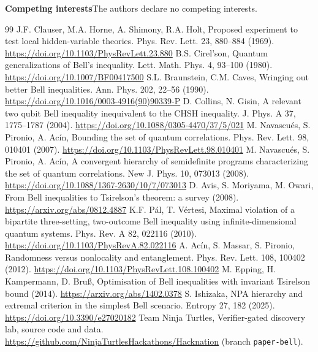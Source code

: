 \documentclass[10pt,twocolumn,a4paper]{article}
\theoremstyle{definition}
\theoremstyle{remark}
\begin{document}
\smallskip
\noindent\textbf{Competing interests}\enspace The authors declare no competing interests.

\begin{thebibliography}{99}\small
{} J.F. Clauser, M.A. Horne, A. Shimony, R.A. Holt, Proposed experiment to test local hidden-variable theories.
Phys. Rev. Lett. 23, 880--884 (1969). \url{https://doi.org/10.1103/PhysRevLett.23.880}
 B.S. Cirel'son, Quantum generalizations of Bell's inequality. Lett. Math. Phys. 4, 93--100 (1980).
\url{https://doi.org/10.1007/BF00417500}
 S.L. Braunstein, C.M. Caves, Wringing out better Bell inequalities. Ann. Phys. 202, 22--56 (1990).
\url{https://doi.org/10.1016/0003-4916(90)90339-P}
 D. Collins, N. Gisin, A relevant two qubit Bell inequality inequivalent to the CHSH inequality. J. Phys. A 37,
1775--1787 (2004). \url{https://doi.org/10.1088/0305-4470/37/5/021}
 M. Navascu\'es, S. Pironio, A. Ac\'in, Bounding the set of quantum correlations. Phys. Rev. Lett. 98, 010401
(2007). \url{https://doi.org/10.1103/PhysRevLett.98.010401}
 M. Navascu\'es, S. Pironio, A. Ac\'in, A convergent hierarchy of semidefinite programs characterizing the set of
quantum correlations. New J. Phys. 10, 073013 (2008). \url{https://doi.org/10.1088/1367-2630/10/7/073013}
 D. Avis, S. Moriyama, M. Owari, From Bell inequalities to Tsirelson's theorem: a survey (2008).
\url{https://arxiv.org/abs/0812.4887}
 K.F. P\'al, T. V\'ertesi, Maximal violation of a bipartite three-setting, two-outcome Bell inequality using
infinite-dimensional quantum systems. Phys. Rev. A 82, 022116 (2010). \url{https://doi.org/10.1103/PhysRevA.82.022116}
 A. Ac\'in, S. Massar, S. Pironio, Randomness versus nonlocality and entanglement. Phys. Rev. Lett. 108, 100402
(2012). \url{https://doi.org/10.1103/PhysRevLett.108.100402}
 M. Epping, H. Kampermann, D. Bru\ss, Optimisation of Bell inequalities with invariant Tsirelson bound (2014).
\url{https://arxiv.org/abs/1402.0378}
 S. Ishizaka, NPA hierarchy and extremal criterion in the simplest Bell scenario. Entropy 27, 182 (2025).
\url{https://doi.org/10.3390/e27020182}
 Team Ninja Turtles, Verifier-gated discovery lab, source code and data.
\url{https://github.com/NinjaTurtlesHackathons/Hacknation} (branch \texttt{paper-bell}).
\end{thebibliography}
\end{document}
